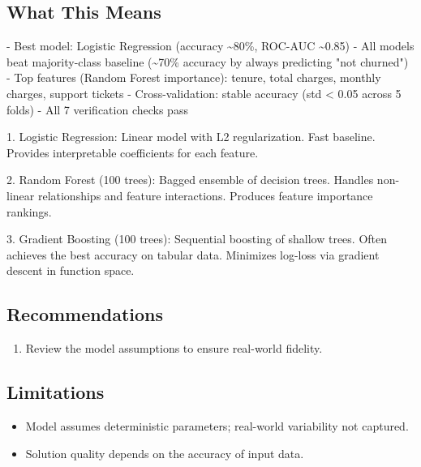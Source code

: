 \documentclass[11pt, a4paper]{article}
\begin{document}
\subsection{What This Means}

- Best model: Logistic Regression (accuracy \textasciitilde{}80\%, ROC-AUC \textasciitilde{}0.85)
- All models beat majority-class baseline (\textasciitilde{}70\% accuracy by always predicting "not churned")
- Top features (Random Forest importance): tenure, total charges, monthly charges, support tickets
- Cross-validation: stable accuracy (std < 0.05 across 5 folds)
- All 7 verification checks pass

1. Logistic Regression: Linear model with L2 regularization. Fast baseline. Provides interpretable coefficients for each feature.

2. Random Forest (100 trees): Bagged ensemble of decision trees. Handles non-linear relationships and feature interactions. Produces feature importance rankings.

3. Gradient Boosting (100 trees): Sequential boosting of shallow trees. Often achieves the best accuracy on tabular data. Minimizes log-loss via gradient descent in function space.



\subsection{Recommendations}

\begin{enumerate}
  \item Review the model assumptions to ensure real-world fidelity.
\end{enumerate}

\subsection{Limitations}

\begin{polyawarnbox}
\begin{itemize}
  \item Model assumes deterministic parameters; real-world variability not captured.
  \item Solution quality depends on the accuracy of input data.
\end{itemize}
\end{polyawarnbox}

\end{document}

